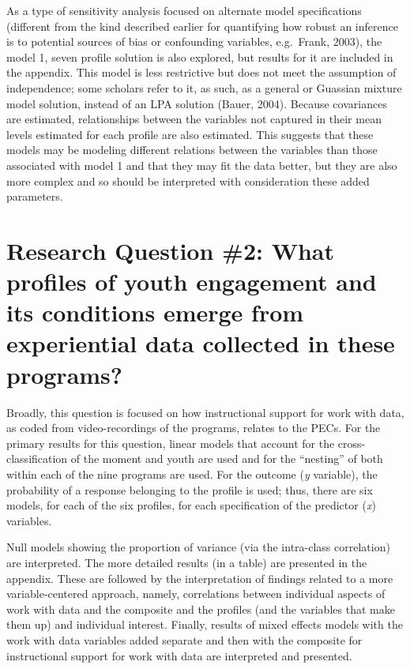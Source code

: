 \documentclass[]{book}
\theoremstyle{definition}
\theoremstyle{definition}
\theoremstyle{definition}
\theoremstyle{remark}
\begin{document}
As a type of sensitivity analysis focused on alternate model
specifications (different from the kind described earlier for
quantifying how robust an inference is to potential sources of bias or
confounding variables, e.g.~Frank, 2003), the model 1, seven profile
solution is also explored, but results for it are included in the
appendix. This model is less restrictive but does not meet the
assumption of independence; some scholars refer to it, as such, as a
general or Guassian mixture model solution, instead of an LPA solution
(Bauer, 2004). Because covariances are estimated, relationships between
the variables not captured in their mean levels estimated for each
profile are also estimated. This suggests that these models may be
modeling different relations between the variables than those associated
with model 1 and that they may fit the data better, but they are also
more complex and so should be interpreted with consideration these added
parameters.

\section{Research Question \#2: What profiles of youth engagement and
its conditions emerge from experiential data collected in these
programs?}\label{research-question-2-what-profiles-of-youth-engagement-and-its-conditions-emerge-from-experiential-data-collected-in-these-programs}

Broadly, this question is focused on how instructional support for work
with data, as coded from video-recordings of the programs, relates to
the PECs. For the primary results for this question, linear models that
account for the cross-classification of the moment and youth are used
and for the ``nesting'' of both within each of the nine programs are
used. For the outcome (\emph{y} variable), the probability of a response
belonging to the profile is used; thus, there are six models, for each
of the six profiles, for each specification of the predictor (\emph{x})
variables.

Null models showing the proportion of variance (via the intra-class
correlation) are interpreted. The more detailed results (in a table) are
presented in the appendix. These are followed by the interpretation of
findings related to a more variable-centered approach, namely,
correlations between individual aspects of work with data and the
composite and the profiles (and the variables that make them up) and
individual interest. Finally, results of mixed effects models with the
work with data variables added separate and then with the composite for
instructional support for work with data are interpreted and presented.
\end{document}
